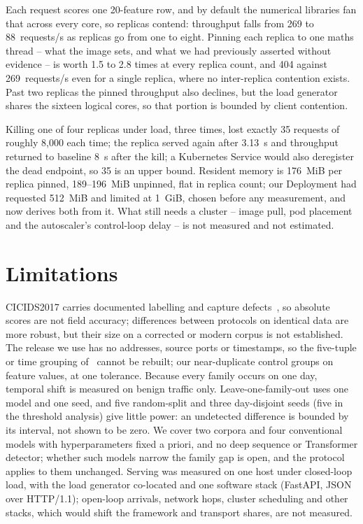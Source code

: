 \documentclass{llncs}
\begin{document}

Each request scores one 20-feature row, and by default the numerical
libraries fan that across every core, so replicas contend: throughput falls
from 269 to 88~requests/s as replicas go from one to eight. Pinning each
replica to one maths thread -- what the image sets, and what we had
previously asserted without evidence -- is worth 1.5 to 2.8 times at every
replica count, and 404 against 269~requests/s even for a single replica,
where no inter-replica contention exists. Past two replicas the pinned
throughput also declines, but the load generator shares the sixteen logical
cores, so that portion is bounded by client contention.

Killing one of four replicas under load, three times, lost exactly 35
requests of roughly 8{,}000 each time; the replica served again after 3.13~s
and throughput returned to baseline 8~s after the kill; a Kubernetes Service
would also deregister the dead endpoint, so 35 is an upper bound. Resident
memory is 176~MiB per replica pinned, 189--196~MiB unpinned, flat in
replica count; our Deployment had requested 512~MiB and limited at 1~GiB,
chosen before any measurement, and now derives both from it. What still
needs a cluster -- image pull, pod placement and the autoscaler's control-loop
delay -- is not measured and not estimated.

\section{Limitations}
\label{sec:limitations}
CICIDS2017 carries documented labelling and capture
defects~\cite{engelen2021troubleshooting,lanvin2023errors}, so absolute
scores are not field accuracy; differences between protocols on identical
data are more robust, but their size on a corrected or modern corpus is not
established. The release we use has no addresses, source ports or
timestamps, so the five-tuple or time grouping
of~\cite{moczkodan2026transformers} cannot be rebuilt; our near-duplicate
control groups on feature values, at one tolerance. Because every family
occurs on one day, temporal shift is measured on benign traffic only.
Leave-one-family-out uses one model and one seed, and five random-split and
three day-disjoint seeds (five in the threshold analysis) give little power:
an undetected difference is bounded by its interval, not shown to be zero.
We cover two corpora and four conventional models with hyperparameters fixed
a priori, and no deep sequence or Transformer detector; whether such models
narrow the family gap is open, and the protocol applies to them unchanged.
Serving was measured on one host under closed-loop load, with the load
generator co-located and one software stack (FastAPI, JSON over HTTP/1.1);
open-loop arrivals, network hops, cluster scheduling and other stacks, which
would shift the framework and transport shares, are not measured.
\end{document}
